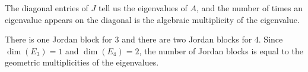 \item The diagonal entries of $J$ tell us the eigenvalues of $A$, and the number of times an eigenvalue appears on the diagonal is the algebraic multiplicity of the eigenvalue.  

\item There is one Jordan block for $3$ and there are two Jordan blocks for $4$. Since $\dim(E_3) = 1$ and $\dim(E_4) = 2$, the number of Jordan blocks is equal to the geometric multiplicities of the eigenvalues. 

\ea


